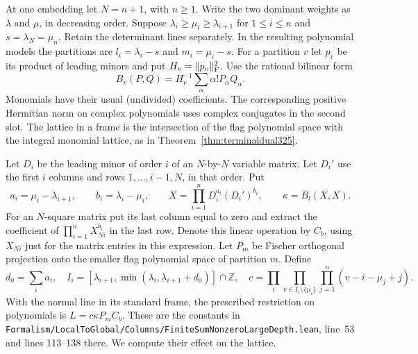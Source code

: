 \documentclass[a4paper,11pt]{article}
\theoremstyle{definition}
\theoremstyle{remark}
\newcommand{\srcloc}[2]{{\small\nolinkurl{#1.lean}}, line~#2}
\numberwithin{equation}{section}
\begin{document}
At one embedding let \(N=n+1\), with \(n\ge1\). Write the two
dominant weights as \(\lambda\) and \(\mu\), in decreasing order.
Suppose \(\lambda_i\ge\mu_i\ge\lambda_{i+1}\) for \(1\le i\le n\)
and \(s=\lambda_N=\mu_n\). Retain the determinant lines separately.
In the resulting polynomial models the partitions are
\(l_i=\lambda_i-s\) and \(m_i=\mu_i-s\). For a partition \(v\)
let \(p_v\) be its product of leading minors and put
\(H_v=\|p_v\|_{\rm F}^2\). Use the rational bilinear form
\[
 B_v(P,Q)=H_v^{-1}\sum_\alpha \alpha! P_\alpha Q_\alpha .
\]
Monomials have their usual (undivided) coefficients. The
corresponding positive Hermitian norm on complex polynomials uses
complex conjugates in the second slot. The lattice in a frame is
the intersection of the flag polynomial space with the integral
monomial lattice, as in Theorem~\ref{thm:terminaldual325}.

Let \(D_i\) be the leading minor of order \(i\) of an
\(N\)-by-\(N\) variable matrix. Let \(D_i'\) use the first
\(i\) columns and rows \(1,\ldots,i-1,N\), in that order. Put
\[
 a_i=\mu_i-\lambda_{i+1},\qquad b_i=\lambda_i-\mu_i,\qquad
 X=\prod_{i=1}^n D_i^{a_i}(D_i')^{b_i},\qquad
 \kappa=B_l(X,X).
\]
For an \(N\)-square matrix put its last column equal to zero and
extract the coefficient of \(\prod_{i=1}^n X_{Ni}^{b_i}\) in the
last row. Denote this linear operation by \(C_b\), using \(X_{Ni}\)
just for the matrix entries in this expression. Let \(P_m\) be
Fischer orthogonal projection onto the smaller flag polynomial
space of partition \(m\). Define
\[
 d_0=\sum_i a_i,\quad
 I_i=[\lambda_{i+1},\min(\lambda_i,\lambda_{i+1}+d_0)]\cap\mathbb Z,
 \quad
 c=\prod_i\prod_{v\in I_i\setminus\{\mu_i\}}\prod_{j=1}^n
                 (v-i-\mu_j+j).
\]
With the normal line in its standard frame, the prescribed
restriction on polynomials is \(L=c\kappa P_m C_b\).
These are the constants in
\srcloc{Formalism/LocalToGlobal/Columns/FiniteSumNonzeroLargeDepth}{53}
and lines 113--138 there. We compute their effect on the lattice.
\end{document}
